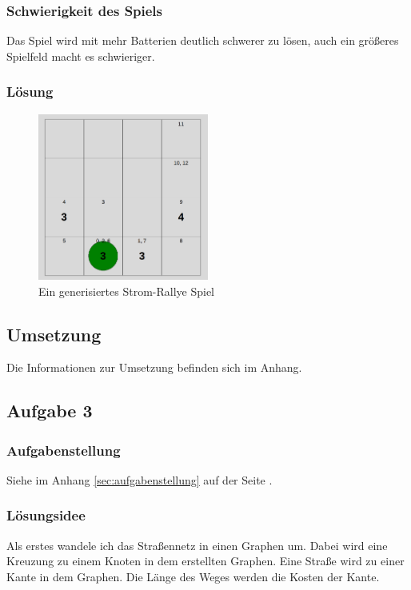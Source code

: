 \documentclass[a4paper,12pt,arial]{scrartcl}
\begin{document}
\subsubsection{Schwierigkeit des Spiels}
Das Spiel wird mit mehr Batterien deutlich schwerer zu lösen, auch ein größeres Spielfeld  macht es schwieriger.
\subsubsection{Lösung}
\begin{figure}[h]
    \centering
    \includegraphics[width=0.5\textwidth]{aufgabe1_2_solution.png}
    \caption{Ein generisiertes Strom-Rallye Spiel}
    \label{fig:loesung2}
\end{figure}
\newpage
\subsection{Umsetzung}
Die Informationen zur Umsetzung befinden sich im Anhang.

\subsection{Aufgabe 3}
\subsubsection{Aufgabenstellung}
Siehe im Anhang \ref{sec:aufgabenstellung} auf der Seite \pageref{sec:aufgabenstellung}.

\subsubsection{Lösungsidee}
Als erstes wandele ich das Straßennetz in einen Graphen um.
Dabei wird eine Kreuzung zu einem Knoten in dem erstellten Graphen.
Eine Straße wird zu einer Kante in dem Graphen.
Die Länge des Weges werden die Kosten der Kante.
\end{document}
